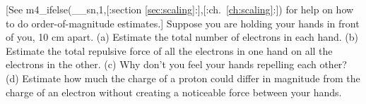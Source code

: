 [See m4_ifelse(__sn,1,[:section \ref{sec:scaling}:],[:ch.~\ref{ch:scaling}:])
for help on how to do order-of-magnitude
estimates.]
        Suppose you are holding your hands in front of you, 10 cm apart.\hwendpart
        (a) Estimate the total number of electrons in each hand.\hwendpart
        (b) Estimate the total repulsive force of all the electrons
        in one hand on all the electrons in the other.\hwendpart
        (c) Why don't you feel your hands repelling each other?\hwendpart
        (d) Estimate how much the charge of a proton could differ in
        magnitude from the charge of an electron without creating a
        noticeable force between your hands.
